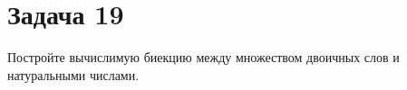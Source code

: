 \documentclass[a4paper,12pt]{article}
\begin{document}
	\begin{comment}
	\section*{Задача 18}
    Постройте вычислимую биекцию между множествами $\N$ и $\N\,\backslash\,\{p^2\,|\,p\in\N\}$.
	\subsection*{Решение}
    Поскольку множество $\N\,\backslash\,\{p^2\,|\,p\in\N\}$ разрешимо, его элементы могут быть перечислены в порядке возрастания (для этого перечисляющему алгоритму нужно последовательно идти по натуральным числам, начиная с 0, и, если текущее число входит в $\N\,\backslash\,\{p^2\,|\,p\in\N\}$, выводить его). Следовательно, элементы $\N\,\backslash\,\{p^2\,|\,p\in\N\}$ могут быть пронумерованы натуральными числами. Тогда можно задать следующее отображение $f: \N\to\N\,\backslash\,\{p^2\,|\,p\in\N\}$: элементу $x\in\N$ сопоставляется элемент $\N\,\backslash\,\{p^2\,|\,p\in\N\}$ с номером $n$. Это отображение инъективно, так как элементы с различными номерами не равны (два различных элементы множества не равны). Также оно сюръективно, поскольку любой элемент $\N\,\backslash\,\{p^2\,|\,p\in\N\}$ имеет некоторый номер, и для элемента из этого множества с номером $n$ прообразом будет число $n$. Таким образом, отображение $g$ биективно.
    
	\sep
	
    \end{comment}
	
	\section*{Задача 19}
	Постройте вычислимую биекцию между множеством двоичных слов и натуральными числами.
\end{document}
